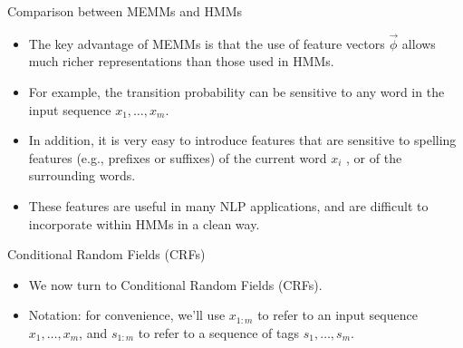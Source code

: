 \documentclass[handout]{beamer}
\begin{document}
\begin{frame}{Comparison between MEMMs and HMMs}
\begin{scriptsize}

\begin{itemize}

\item  The key advantage of MEMMs is that the use of feature vectors $\vec{\phi}$ allows much
richer representations than those used in HMMs.

\item For example, the transition probability can be sensitive to any word in the input sequence $x_1, \dots, x_m$.

\item In addition, it is very easy to introduce features that are sensitive to spelling features (e.g., prefixes or suffixes) of the current word $x_i$ , or of the surrounding words.

\item These features are useful in many NLP applications, and are difficult to incorporate within HMMs in a clean way.

\end{itemize}

\end{scriptsize}
\end{frame}



\begin{frame}{Conditional Random Fields (CRFs)}
\begin{scriptsize}

\begin{itemize}

\item  We now turn to Conditional Random Fields (CRFs).

\item Notation: for convenience, we'll use $x_{1:m}$ to refer to an input sequence $x_1 ,\dots,x_m$, and $s_{1:m}$ to refer to a sequence of tags $s_1, \dots, s_m$.

\end{itemize}

\end{scriptsize}
\end{frame}
\end{document}

